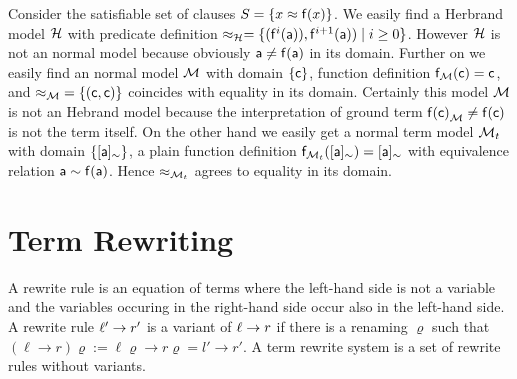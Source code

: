 \begin{example}
	Consider the satisfiable set of clauses $S = \{ x \approx {\mathsf f}(x) \}$. 
%	
	We easily find a Herbrand model ${\mathcal H}$ with
	predicate definition $\approx_{\mathcal H} = \{ ({\mathsf f}^{i}({\mathsf a})), {\mathsf f}^{i+1}({\mathsf a})) \mid i\geq 0  \} $. 
	However ${\mathcal H}$ is not an normal model because obviously ${\mathsf a}\neq{\mathsf f}({\mathsf a})$ in its domain.
%	
	Further on we easily find an normal model ${\mathcal M}$ 
	with domain $\{ {\mathsf c} \}$, function definition ${\mathsf f}_{\mathcal M}({\mathsf c}) = {\mathsf c}$, 
	and ${\approx_{\mathcal M}} = \{ ({\mathsf c},{\mathsf c})\}$ coincides with equality in its domain.
	Certainly this model ${\mathcal M}$ is not an Hebrand model 
	because the interpretation of ground term ${{\mathsf f}({\mathsf c})}_{\mathcal M} \neq {\mathsf f}({\mathsf c})$ is not the term itself.
%	
	On the other hand we easily get a normal term model ${\mathcal M}_t$ with domain $\{ [{\mathsf a}]_\sim\}$, 
	a plain function definition
	${\mathsf f}_{{\mathcal M}_t}([{\mathsf a}]_\sim) = [{\mathsf a}]_\sim$
	with equivalence relation
	${\mathsf a} \sim {\mathsf f}({\mathsf a})$.
	Hence $\approx_{{\mathcal M}_t}$ agrees to equality in its domain.	
\end{example}


\section{Term Rewriting}\label{sec:termrewriting}


\begin{definition}\label{def:rewriterule}
	A {\myem rewrite rule} is an equation of terms where the left-hand side is not a variable
	and the variables occuring in the right-hand side occur also in the left-hand side.
	A rewrite rule $\ell'\rightarrow r'$ is a {\myem variant} of $\ell\rightarrow r$ if there is a renaming $\varrho$
	such that 
	$(\ell\rightarrow r)\varrho := \ell\varrho\rightarrow r\varrho = l'\rightarrow r'$.
	A {\myem term rewrite system} is a set of rewrite rules without variants.
\end{definition}

